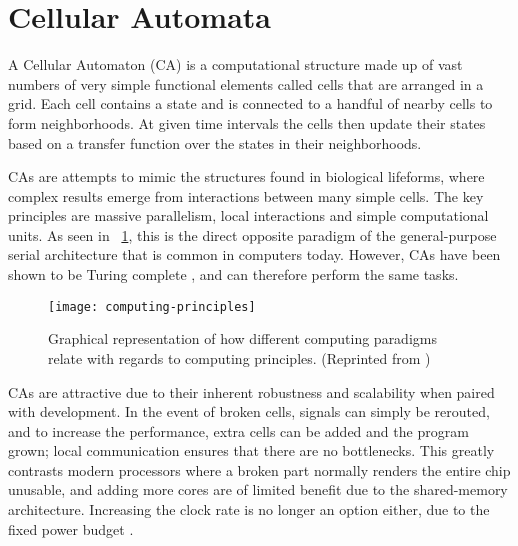 
\section{Cellular Automata}

A Cellular Automaton (CA) is a computational structure made up of vast numbers of very simple functional elements called cells that are arranged in a grid.
Each cell contains a state and is connected to a handful of nearby cells to form neighborhoods.
At given time intervals the cells then update their states based on a transfer function over the states in their neighborhoods.\footnotemark


CAs are attempts to mimic the structures found in biological lifeforms, where complex results emerge from interactions between many simple cells.
The key principles are massive parallelism, local interactions and simple computational units.
As seen in \figurename~\ref{fig:computing-principles}, this is the direct opposite paradigm of the general-purpose serial architecture that is common in computers today.
However, CAs have been shown to be Turing complete \cite{codd1968cellular, neumann1966selfreplication}, and can therefore perform the same tasks.

\begin{figure}[!ht]
    \centering
    \texttt{[image: computing-principles]}
    \caption[Computing principles]{
        Graphical representation of how different computing paradigms relate with regards to computing principles.
        (Reprinted from \cite{sipper1999emergence})
    }
    \label{fig:computing-principles}
\end{figure}

CAs are attractive due to their inherent robustness and scalability when paired with development.
In the event of broken cells, signals can simply be rerouted, and to increase the performance, extra cells can be added and the program grown; local communication ensures that there are no bottlenecks.
This greatly contrasts modern processors where a broken part normally renders the entire chip unusable, and adding more cores are of limited benefit due to the shared-memory architecture.
Increasing the clock rate is no longer an option either, due to the fixed power budget .

